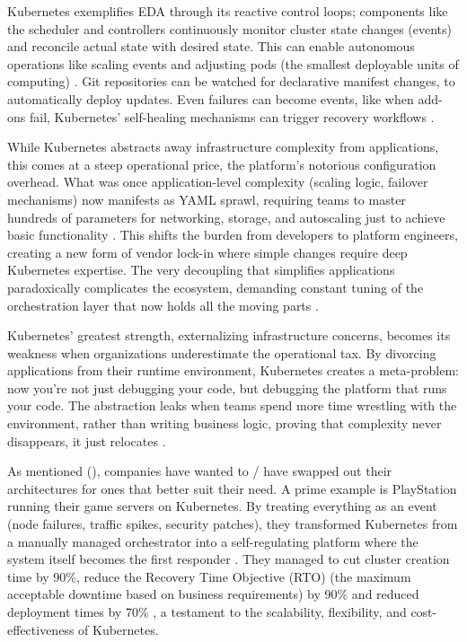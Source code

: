 \documentclass[]{final}
\begin{document}
Kubernetes exemplifies EDA through its reactive control loops; components like
the scheduler and controllers continuously monitor cluster state changes
(events) and reconcile actual state with desired state. This can enable
autonomous operations like scaling events and adjusting pods (the smallest
deployable units of computing) \cite{noauthor_fully_nodate}. Git repositories can be watched for declarative
manifest changes, to automatically deploy updates. Even failures can become
events, like when add-ons fail, Kubernetes' self-healing mechanisms
can trigger recovery workflows \cite{noauthor_fully_nodate}.

While Kubernetes abstracts away infrastructure complexity from applications,
this comes at a steep operational price, the platform's notorious configuration
overhead. What was once application-level complexity (scaling logic, failover
mechanisms) now manifests as YAML sprawl, requiring teams to master hundreds of
parameters for networking, storage, and autoscaling just to achieve basic
functionality \cite{noauthor_fully_nodate}. This shifts the burden from developers to platform engineers,
creating a new form of vendor lock-in where simple changes require deep
Kubernetes expertise. The very decoupling that simplifies applications
paradoxically complicates the ecosystem, demanding constant tuning of the
orchestration layer that now holds all the moving parts \cite{noauthor_fully_nodate}.

Kubernetes' greatest strength, externalizing infrastructure concerns, becomes
its weakness when organizations underestimate the operational tax. By
divorcing applications from their runtime environment, Kubernetes creates a
meta-problem: now you're not just debugging your code, but debugging the
platform that runs your code. The abstraction leaks when teams spend more time
wrestling with the environment, rather than writing business logic, proving that
complexity never disappears, it just relocates \cite{noauthor_fully_nodate}.

As mentioned {\hypersetup{linkcolor=teal}(\pageref{rationale})}, companies have
wanted to / have swapped out their architectures
for ones that better suit their need. A prime example is PlayStation running
their game servers on Kubernetes. By treating everything as an event (node failures, traffic spikes, security
patches), they transformed Kubernetes from a manually managed orchestrator
into a self-regulating platform where the system itself becomes the first
responder \cite{noauthor_fully_nodate}. They managed to cut cluster creation time by
90\%, reduce the Recovery Time Objective (RTO) (the maximum acceptable downtime
based on business requirements) by 90\% and reduced deployment times by 70\% \cite{noauthor_fully_nodate},
a testament to the scalability, flexibility, and cost-effectiveness of Kubernetes.
\end{document}
